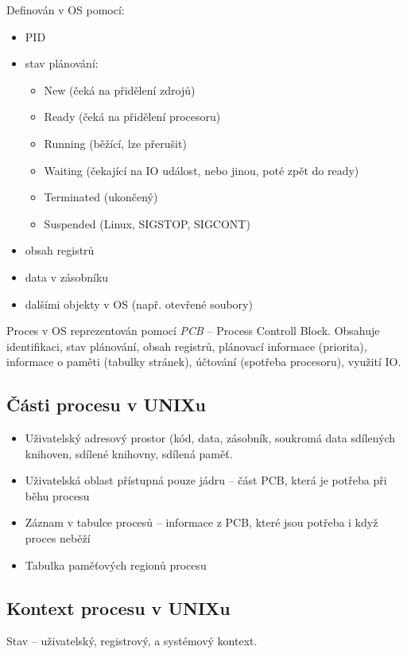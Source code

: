 \documentclass[a4paper, 11pt]{report}
\begin{document}
Definován v OS pomocí:
\begin{itemize}
	\item PID
	\item stav plánování:
	\begin{itemize}
		\item New (čeká na přidělení zdrojů)
		\item Ready (čeká na přidělení procesoru)
		\item Running (běžící, lze přerušit)
		\item Waiting (čekající na IO událost, nebo jinou, poté zpět do ready)
		\item Terminated (ukončený)
		\item Suspended (Linux, SIGSTOP, SIGCONT)
	\end{itemize}

	\item obsah registrů
	\item data v zásobníku
	\item dalšími objekty v OS (např. otevřené soubory)
\end{itemize}

Proces v OS reprezentován pomocí \emph{PCB} -- Process Controll Block. Obsahuje identifikaci, stav plánování, obsah registrů, plánovací informace (priorita), informace o paměti (tabulky stránek), účtování (spotřeba procesoru), využití IO.

\subsection{Části procesu v UNIXu}

\begin{itemize}
	\item Uživatelský adresový prostor (kód, data, zásobník, soukromá data sdílených knihoven, sdílené knihovny, sdílená paměť.
	\item Uživatelská oblast přístupná pouze jádru -- část PCB, která je potřeba při běhu procesu
	\item Záznam v tabulce procesů -- informace z PCB, které jsou potřeba i když proces neběží
	\item Tabulka paměťových regionů procesu
\end{itemize}

\subsection{Kontext procesu v UNIXu}
Stav -- uživatelský, registrový, a systémový kontext.
\end{document}
